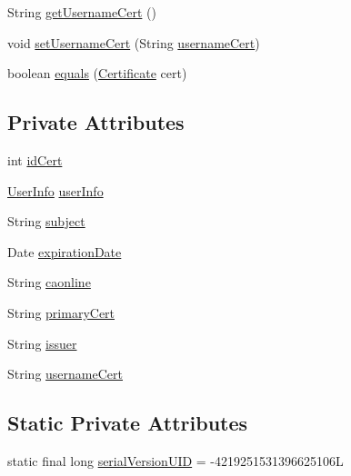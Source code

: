 \begin{DoxyCompactItemize}
\item 
String \hyperlink{classportal_1_1registration_1_1domain_1_1Certificate_a523b5944db11a39de56b45f233227fd2}{getUsernameCert} ()
\item 
void \hyperlink{classportal_1_1registration_1_1domain_1_1Certificate_a004787ddffdd6f50f5f38accee3155d5}{setUsernameCert} (String \hyperlink{classportal_1_1registration_1_1domain_1_1Certificate_a27dd5145ea35c206c000e87485841d50}{usernameCert})
\item 
boolean \hyperlink{classportal_1_1registration_1_1domain_1_1Certificate_ab1b7623aaf7364f3b30f8b612e887353}{equals} (\hyperlink{classportal_1_1registration_1_1domain_1_1Certificate}{Certificate} cert)
\end{DoxyCompactItemize}
\subsection*{Private Attributes}
\begin{DoxyCompactItemize}
\item 
int \hyperlink{classportal_1_1registration_1_1domain_1_1Certificate_a0861b0203d5d1924de38adf80ecde323}{idCert}
\item 
\hyperlink{classportal_1_1registration_1_1domain_1_1UserInfo}{UserInfo} \hyperlink{classportal_1_1registration_1_1domain_1_1Certificate_a17f801286e01e02c092b9a92b3220b13}{userInfo}
\item 
String \hyperlink{classportal_1_1registration_1_1domain_1_1Certificate_aa5e1b492240c17ca0b863da96627855f}{subject}
\item 
Date \hyperlink{classportal_1_1registration_1_1domain_1_1Certificate_a059decff874c0a7667aee9122d9e7815}{expirationDate}
\item 
String \hyperlink{classportal_1_1registration_1_1domain_1_1Certificate_ad1d84a6be3973282fb57b0aee10a61e2}{caonline}
\item 
String \hyperlink{classportal_1_1registration_1_1domain_1_1Certificate_a3a4632cbb077929d70538d0d4a07e1bd}{primaryCert}
\item 
String \hyperlink{classportal_1_1registration_1_1domain_1_1Certificate_a3d2cd307e97c90342894a007fb235d0c}{issuer}
\item 
String \hyperlink{classportal_1_1registration_1_1domain_1_1Certificate_a27dd5145ea35c206c000e87485841d50}{usernameCert}
\end{DoxyCompactItemize}
\subsection*{Static Private Attributes}
\begin{DoxyCompactItemize}
\item 
static final long \hyperlink{classportal_1_1registration_1_1domain_1_1Certificate_a7bc0118d146f99aa265f3b026fff8b4b}{serialVersionUID} = -\/4219251531396625106L
\end{DoxyCompactItemize}


